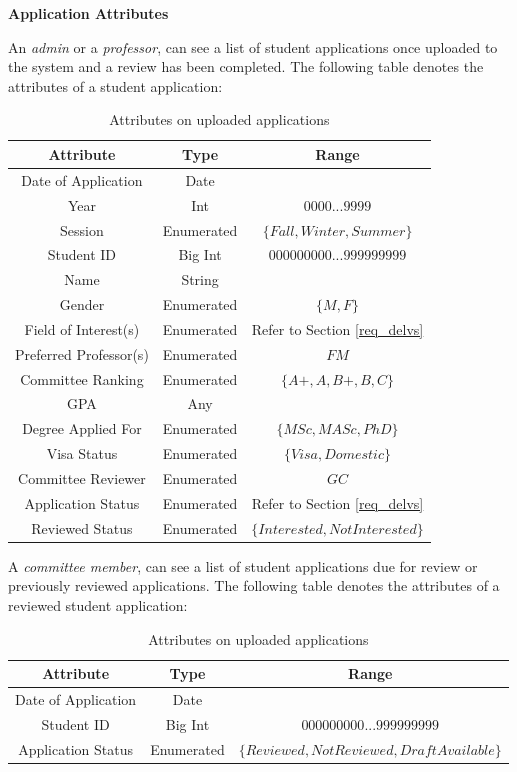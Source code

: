 \documentclass[fontsize=12pt,paper=letter,twoside]{scrartcl}
\begin{document}
\bigskip
\noindent\textbf{Application Attributes}

\smallskip

\noindent An \emph{admin} or a \emph{professor}, can see a list of student applications once uploaded to the system and a review has been completed. The following table denotes the attributes of a student application:

\begin{table}[!htb]
\begin{tabular}{| c | c | c |}
	\cline{1-3}
	\textbf{Attribute} & \textbf{Type} & \textbf{Range}\\ \hline
	Date of Application & Date & \\ \hline
	Year & Int & $0000 ... 9999$ \\ \hline
	Session & Enumerated & $\{Fall, Winter, Summer\}$ \\ \hline
	Student ID & Big Int & $000000000 ... 999999999$ \\ \hline
	Name & String & \\ \hline
	Gender & Enumerated & $\{M, F\}$ \\ \hline
	Field of Interest(s) & Enumerated & Refer to Section \ref{req_delvs} \\ \hline
	Preferred Professor(s) & Enumerated & $FM$ \\ \hline
	Committee Ranking & Enumerated & $\{A+, A, B+, B, C\}$ \\ \hline
	GPA & Any & \\ \hline
	Degree Applied For & Enumerated & $\{MSc, MASc, PhD\}$ \\ \hline
	Visa Status & Enumerated & $\{Visa, Domestic\}$ \\ \hline
	Committee Reviewer & Enumerated & $GC$ \\ \hline
	Application Status & Enumerated & Refer to Section \ref{req_delvs} \\ \hline
	Reviewed Status & Enumerated & $\{Interested, Not Interested\}$ \\ \hline
\end{tabular}
\caption {Attributes on uploaded applications}
\label{tbl:attr_uploaded}
\end{table}


\noindent A \emph{committee member}, can see a list of student applications due for review or previously reviewed applications. The following table denotes the attributes of a reviewed student application:

\begin{table}[!htb]
\begin{tabular}{| c | c | c |}
	\cline{1-3}
	\textbf{Attribute} & \textbf{Type} & \textbf{Range}\\ \hline
	Date of Application & Date & \\ \hline
	Student ID & Big Int & $000000000 ... 999999999$ \\ \hline
	Application Status & Enumerated & $\{Reviewed, Not Reviewed, Draft Available\}$ \\ \hline
\end{tabular}
\caption {Attributes on uploaded applications}
\label{tbl:attr_reviewed}
\end{table}
\end{document}
